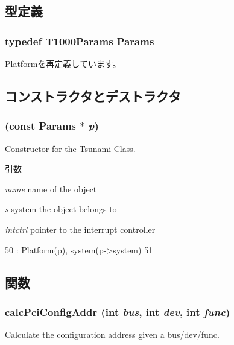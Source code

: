 \subsection{型定義}
\hypertarget{classT1000_abc8ac05350758af915732ecded3a736e}{
\subsubsection[{Params}]{\setlength{\rightskip}{0pt plus 5cm}typedef T1000Params {\bf Params}}}
\label{classT1000_abc8ac05350758af915732ecded3a736e}


\hyperlink{classPlatform_af4e77eaf2602e4808deef7d1ba95e579}{Platform}を再定義しています。

\subsection{コンストラクタとデストラクタ}
\hypertarget{classT1000_a08823bfcfa87c58789ccb0d6f64f2551}{
\subsubsection[{T1000}]{ (const {\bf Params} $\ast$ {\em p})}}
\label{classT1000_a08823bfcfa87c58789ccb0d6f64f2551}
Constructor for the \hyperlink{classTsunami}{Tsunami} Class. 
\begin{DoxyParams}{引数}
\item[{\em name}]name of the object \item[{\em s}]system the object belongs to \item[{\em intctrl}]pointer to the interrupt controller \end{DoxyParams}



\begin{DoxyCode}
50     : Platform(p), system(p->system)
51 {}
\end{DoxyCode}


\subsection{関数}
\hypertarget{classT1000_a5b8797a83289cb5fd895c9a5dc7eae6f}{
\subsubsection[{calcPciConfigAddr}]{ calcPciConfigAddr (int {\em bus}, \/  int {\em dev}, \/  int {\em func})}}
\label{classT1000_a5b8797a83289cb5fd895c9a5dc7eae6f}
Calculate the configuration address given a bus/dev/func. 

